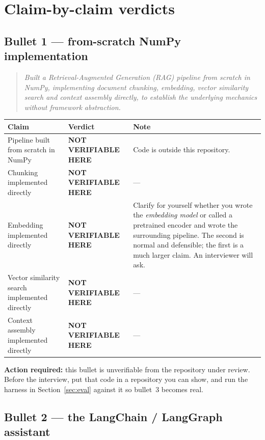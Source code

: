 \documentclass[11pt,a4paper]{article}
\newcommand{\UNV}{\textcolor{partial}{\textbf{NOT VERIFIABLE HERE}}}
\begin{document}
\section{Claim-by-claim verdicts}

\subsection{Bullet 1 --- from-scratch NumPy implementation}

\begin{quote}\itshape
Built a Retrieval-Augmented Generation (RAG) pipeline from scratch in NumPy,
implementing document chunking, embedding, vector similarity search and context
assembly directly, to establish the underlying mechanics without framework
abstraction.
\end{quote}

\begin{longtable}{@{}p{7.2cm}p{3.2cm}p{5cm}@{}}
\toprule
\textbf{Claim} & \textbf{Verdict} & \textbf{Note} \\
\midrule
\endhead
Pipeline built from scratch in NumPy & \UNV & Code is outside this repository. \\
Chunking implemented directly & \UNV & --- \\
Embedding implemented directly & \UNV & Clarify for yourself whether you wrote the
\emph{embedding model} or called a pretrained encoder and wrote the surrounding
pipeline. The second is normal and defensible; the first is a much larger claim.
An interviewer will ask. \\
Vector similarity search implemented directly & \UNV & --- \\
Context assembly implemented directly & \UNV & --- \\
\bottomrule
\end{longtable}

\noindent
\textbf{Action required:} this bullet is unverifiable from the repository under
review. Before the interview, put that code in a repository you can show, and run
the harness in Section~\ref{sec:eval} against it so bullet~3 becomes real.

\subsection{Bullet 2 --- the LangChain / LangGraph assistant}
\end{document}
